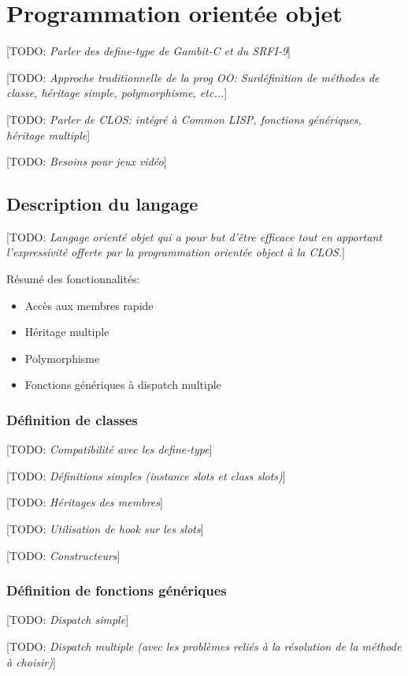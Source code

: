 \documentclass[12pt,oneside,letterpaper,francais]{book}
\newcommand{\todo}[1]{[TODO: {\it #1}]}
\begin{document}
\chapter{Programmation orientée objet}

\todo{Parler des define-type de Gambit-C et du SRFI-9}

\todo{Approche traditionnelle de la prog OO: Surdéfinition de méthodes de
  classe, héritage simple, polymorphisme, etc...}

\todo{Parler de CLOS: intégré à Common LISP, fonctions génériques, héritage
  multiple}

\todo{Besoins pour jeux vidéo}

\section{Description du langage}
\todo{Langage orienté objet qui a pour but d'être efficace tout en
  apportant l'expressivité offerte par la programmation orientée
  object à la CLOS.}

Résumé des fonctionnalités:
\begin{itemize}
\item Accès aux membres rapide
\item Héritage multiple
\item Polymorphisme
\item Fonctions génériques à \og dispatch \fg multiple
\end{itemize}

\subsection{Définition de classes}
\todo{Compatibilité avec les define-type}

\todo{Définitions simples (instance slots et class slots)}

\todo{Héritages des membres}

\todo{Utilisation de hook sur les slots}

\todo{Constructeurs}


\subsection{Définition de fonctions génériques}
\todo{Dispatch simple}

\todo{Dispatch multiple (avec les problèmes reliés à la résolution de la méthode à choisir)}
\end{document}
